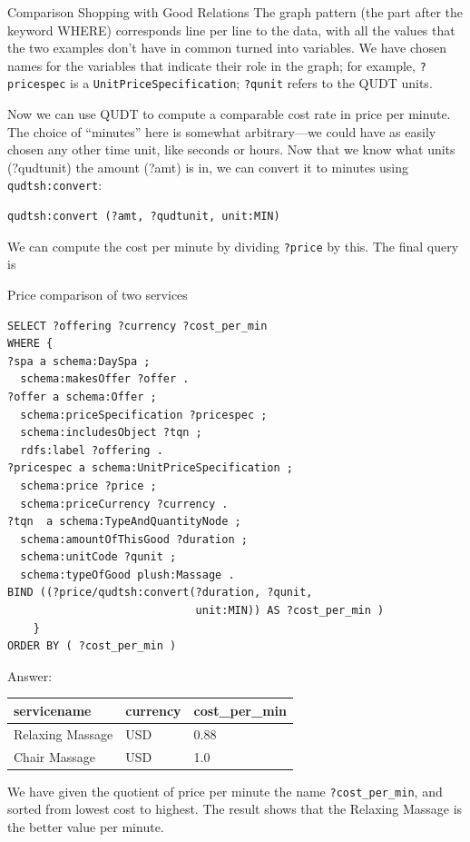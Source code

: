 \begin{challenge}{Comparison Shopping with Good Relations}
The graph pattern (the part after the keyword WHERE) corresponds line
per line to the data, with all the values that the two examples don't
have in common turned into variables. We have chosen names for the
variables that indicate their role in the graph; for example, \texttt{?pricespec}
is a \texttt{UnitPriceSpecification}; \texttt{?qunit} refers to the QUDT units.

Now we can use QUDT to compute a comparable cost rate in price per
minute. The choice of ``minutes'' here is somewhat arbitrary---we could
have as easily chosen any other time unit, like seconds or hours. Now
that we know what units (?qudtunit) the amount (?amt) is in, we can
convert it to minutes using \texttt{qudtsh:convert}:

\begin{lstlisting}
qudtsh:convert (?amt, ?qudtunit, unit:MIN)
\end{lstlisting}

We can compute the cost per minute by dividing \texttt{?price} by this. The final
query is

\begin{query}Price comparison of two services\end{query}
\begin{lstlisting}
SELECT ?offering ?currency ?cost_per_min
WHERE {
?spa a schema:DaySpa ;
  schema:makesOffer ?offer .
?offer a schema:Offer ;
  schema:priceSpecification ?pricespec ;
  schema:includesObject ?tqn ;
  rdfs:label ?offering .
?pricespec a schema:UnitPriceSpecification ;
  schema:price ?price ;
  schema:priceCurrency ?currency .
?tqn  a schema:TypeAndQuantityNode ;
  schema:amountOfThisGood ?duration ;
  schema:unitCode ?qunit ;  
  schema:typeOfGood plush:Massage .
BIND ((?price/qudtsh:convert(?duration, ?qunit,
                             unit:MIN)) AS ?cost_per_min )
    }
ORDER BY ( ?cost_per_min )
\end{lstlisting}

Answer:

\begin{tabular}{|lll|}
\hline
servicename&currency&cost\_per\_min\\
\hline
Relaxing Massage&USD&0.88\\
Chair Massage&USD&1.0\\
\hline
\end{tabular}

We have given the quotient of price per minute the name \texttt{?cost\_per\_min},
and sorted from lowest cost to highest. The result shows that the
Relaxing Massage is the better value per minute.
\end{challenge}

